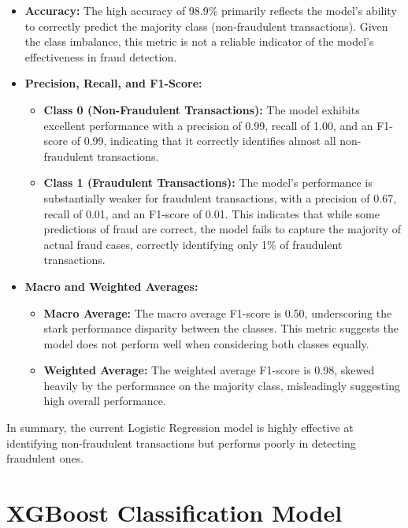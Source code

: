 \documentclass[12pt,a4paper]{report}
\begin{document}
\begin{itemize}
    \item \textbf{Accuracy:} The high accuracy of 98.9\% primarily reflects the model's ability to correctly predict the majority class (non-fraudulent transactions). Given the class imbalance, this metric is not a reliable indicator of the model's effectiveness in fraud detection.
    
    \item \textbf{Precision, Recall, and F1-Score:}
    \begin{itemize}
        \item \textbf{Class 0 (Non-Fraudulent Transactions):} The model exhibits excellent performance with a precision of 0.99, recall of 1.00, and an F1-score of 0.99, indicating that it correctly identifies almost all non-fraudulent transactions.
        \item \textbf{Class 1 (Fraudulent Transactions):} The model's performance is substantially weaker for fraudulent transactions, with a precision of 0.67, recall of 0.01, and an F1-score of 0.01. This indicates that while some predictions of fraud are correct, the model fails to capture the majority of actual fraud cases, correctly identifying only 1\% of fraudulent transactions.
    \end{itemize}
    
    \item \textbf{Macro and Weighted Averages:}
    \begin{itemize}
        \item \textbf{Macro Average:} The macro average F1-score is 0.50, underscoring the stark performance disparity between the classes. This metric suggests the model does not perform well when considering both classes equally.
        \item \textbf{Weighted Average:} The weighted average F1-score is 0.98, skewed heavily by the performance on the majority class, misleadingly suggesting high overall performance.
    \end{itemize}
\end{itemize}


In summary, the current Logistic Regression model is highly effective at identifying non-fraudulent transactions but performs poorly in detecting fraudulent ones.\\


\section{XGBoost Classification Model}
\end{document}
